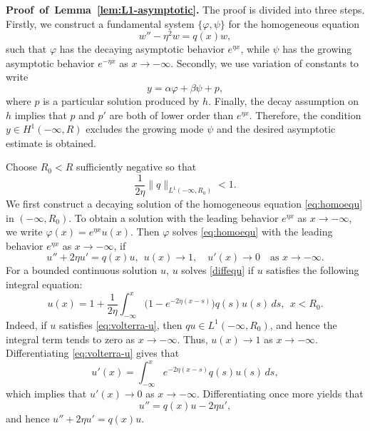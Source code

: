 \documentclass[11pt]{article}
\numberwithin{equation}{section}
\theoremstyle{definition}
\begin{document}
\vspace {.05cm}

\mbox{\bf Proof of Lemma \ref{lem:L1-asymptotic}.}
The proof is divided into three steps. Firstly, we construct a fundamental system
\(\{\varphi,\psi\}\) for the homogeneous equation
\begin{equation}\label{eq:homoequ}
w''-\eta^2w=q(x)w,
\end{equation}
such that \(\varphi\) has the decaying asymptotic behavior \(e^{\eta x}\), while
\(\psi\) has the growing asymptotic behavior \(e^{-\eta x}\) as
\(x\to-\infty\). Secondly, we use variation of constants to write
\[
y=\alpha\varphi+\beta\psi+p,
\]
where \(p\) is a particular solution produced by \(h\). Finally, the decay
assumption on \(h\) implies that \(p\) and \(p'\) are both of lower order than
\(e^{\eta x}\). Therefore, the condition \(y\in H^1(-\infty,R)\) excludes the
growing mode \(\psi\) and the desired asymptotic estimate is obtained.
	
\medskip
{}



Choose \(R_0<R\) sufficiently negative so that
\begin{equation}\label{eq:q-small-tail}
	\frac{1}{2\eta}\|q\|_{L^1(-\infty,R_0)}<1 .
\end{equation}
We first construct a decaying solution of the homogeneous equation
\eqref{eq:homoequ} in $(-\infty,R_0)$. To obtain a solution with the leading behavior
\(e^{\eta x}\) as \(x\to-\infty\), we write
\(
\varphi(x)=e^{\eta x}u(x).
\)
Then $\varphi$ solves \eqref{eq:homoequ} with the  leading behavior
\(e^{\eta x}\) as \(x\to-\infty\), if
\begin{equation}\label{diffequ}
u''+2\eta u'=q(x)u,
\ \
u(x)\to1,\quad u'(x)\to0
\quad\text{as }x\to-\infty .	
\end{equation}
For a bounded continuous solution \(u\), $u$ solves \eqref{diffequ} if
$u$ satisfies the following integral equation:
 \begin{equation}\label{eq:volterra-u}
u(x) = 1+ \frac{1}{2\eta} \int_{-\infty}^{x} \bigl(1-e^{-2\eta(x-s)}\bigr)q(s)u(s)\,ds, \ \  x<R_0 . \end{equation}
Indeed, if \(u\) satisfies \eqref{eq:volterra-u}, then \(qu\in L^1(-\infty,R_0)\), and hence the integral term tends to zero as \(x\to-\infty\).
Thus, \(u(x)\to1\) as \(x\to-\infty\).
Differentiating \eqref{eq:volterra-u} gives that
\[ u'(x) = \int_{-\infty}^{x} e^{-2\eta(x-s)}q(s)u(s)\,ds, \]
which implies that \(u'(x)\to0\) as \(x\to-\infty\). Differentiating once more yields that \[ u''=q(x)u-2\eta u', \] and hence \(u''+2\eta u'=q(x)u\).
\end{document}
